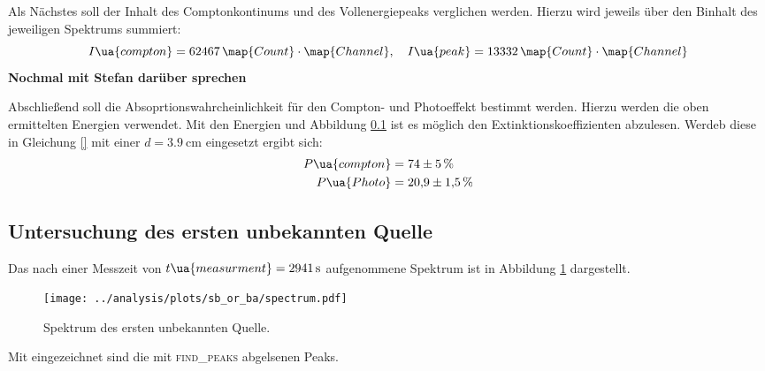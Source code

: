 Als Nächstes soll der Inhalt des Comptonkontinums und des Vollenergiepeaks
verglichen werden. Hierzu wird jeweils über den Binhalt des jeweiligen Spektrums
summiert:
\begin{equation}
  \label{eq:flacehe}
  I\ua{compton} = 62467 \, \map{Count}\cdot\map{Channel}, \quad I\ua{peak}=13332\, \map{Count}\cdot\map{Channel}
\end{equation}
\textbf{Nochmal mit Stefan darüber sprechen}

Abschließend soll die Absoprtionswahrcheinlichkeit für den
Compton- und Photoeffekt bestimmt werden. Hierzu werden die
oben ermittelten Energien verwendet. Mit den Energien und Abbildung
\ref{} ist es möglich den Extinktionskoeffizienten abzulesen.
Werdeb diese in Gleichung \eqref{} mit einer $d=\SI{3.9}{\centi\meter}$ eingesetzt ergibt sich:
\begin{align}
  \label{eq:absorptioswahrscheinlichkeit}
  \begin{aligned}
    P\ua{compton}&= \num{74\pm5}\,\% \\
    P\ua{Photo}&= \num{20.9\pm1.5}\, \%
  \end{aligned}
\end{align}

\subsection{Untersuchung des ersten unbekannten Quelle}
Das nach einer Messzeit von $t\ua{measurment}=\SI{2941}{\second}$ aufgenommene
Spektrum ist in Abbildung \ref{fig:spektrum_sb_or_ba} dargestellt.
\begin{figure}
  \centering
  \texttt{[image: ../analysis/plots/sb\_or\_ba/spectrum.pdf]}
  \caption{Spektrum des ersten unbekannten Quelle.}
  \label{fig:spektrum_sb_or_ba}
\end{figure}
Mit eingezeichnet sind die mit \textsc{find_peaks} abgelsenen Peaks.
